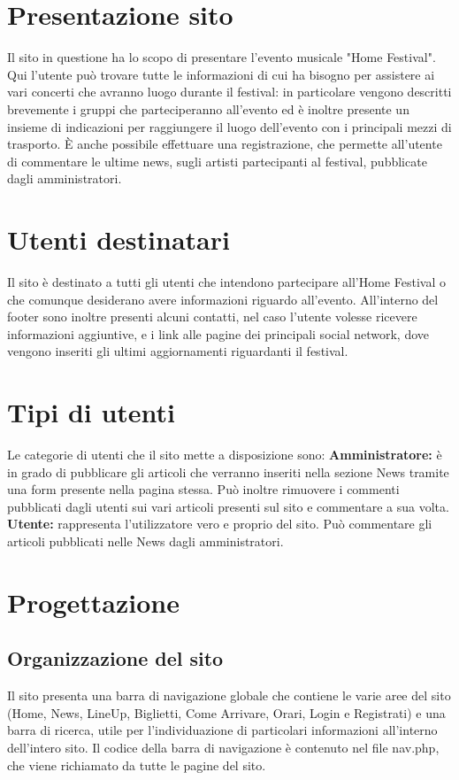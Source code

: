 \documentclass[10pt, a4paper]{article}
\begin{document}
\newpage
\hypersetup{hidelinks}
\tableofcontents
\newpage
\section{Presentazione sito}
Il sito in questione ha lo scopo di presentare l'evento musicale "Home Festival". Qui l'utente può trovare tutte le informazioni di cui ha bisogno per assistere ai vari concerti che avranno luogo durante il festival: in particolare vengono descritti brevemente i gruppi che parteciperanno all'evento ed è inoltre presente un insieme di indicazioni per raggiungere il luogo dell'evento con i principali mezzi di trasporto.
È anche possibile effettuare una registrazione, che permette all'utente di commentare le ultime news, sugli artisti partecipanti al festival, pubblicate dagli amministratori. 
\section{Utenti destinatari}
Il sito è destinato a tutti gli utenti che intendono partecipare all’Home Festival o che comunque desiderano avere informazioni riguardo all’evento.  
All’interno del footer sono inoltre presenti alcuni contatti, nel caso l’utente volesse ricevere informazioni aggiuntive, e i link alle pagine dei principali social network, dove vengono inseriti gli ultimi aggiornamenti riguardanti il festival.
\section{Tipi di utenti}
Le categorie di utenti che il sito mette a disposizione sono:
\newline \textbf{Amministratore: }è in grado di pubblicare gli articoli che verranno inseriti nella sezione News tramite una form presente nella pagina stessa. Può inoltre rimuovere i commenti pubblicati dagli utenti sui vari articoli presenti sul sito e commentare a sua volta.
\newline \textbf{Utente: }rappresenta l'utilizzatore vero e proprio del sito. Può commentare gli articoli pubblicati nelle News dagli amministratori.
\section{Progettazione}
\subsection{Organizzazione del sito}
Il sito presenta una barra di navigazione globale che contiene le varie aree del sito (Home, News, LineUp, Biglietti, Come Arrivare, Orari, Login e Registrati) e una barra di ricerca, utile per l'individuazione di particolari informazioni all'interno dell'intero sito.
Il codice della barra di navigazione è contenuto nel file nav.php, che viene richiamato da tutte le pagine del sito.
\end{document}
